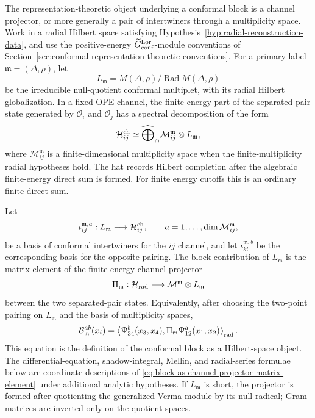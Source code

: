 The representation-theoretic object underlying a conformal block is a channel
projector, or more generally a pair of intertwiners through a multiplicity
space.  Work in a radial Hilbert space satisfying
Hypothesis~\ref{hyp:radial-reconstruction-data}, and use the positive-energy
\(\widetilde G_{\rm conf}^{\rm Lor}\)-module conventions of
Section~\ref{sec:conformal-representation-theoretic-conventions}.  For a
primary label \(\mathfrak m=(\Delta,\rho)\), let
\[
  L_{\mathfrak m}
  =
  M(\Delta,\rho)/\operatorname{Rad}M(\Delta,\rho)
\]
be the irreducible null-quotient conformal multiplet, with its radial Hilbert
globalization.  In a fixed OPE channel, the finite-energy part of the
separated-pair state generated by \(\mathcal O_i\) and \(\mathcal O_j\) has a
spectral decomposition of the form
\begin{equation}
  \mathcal H_{ij}^{\rm ch}
  \simeq
  \widehat\bigoplus_{\mathfrak m}
  \mathcal M_{ij}^{\mathfrak m}\otimes L_{\mathfrak m},
  \label{eq:channel-hilbert-module-decomposition}
\end{equation}
where \(\mathcal M_{ij}^{\mathfrak m}\) is a finite-dimensional multiplicity
space when the finite-multiplicity radial hypotheses hold.  The hat records
Hilbert completion after the algebraic finite-energy direct sum is formed.
For finite energy cutoffs this is an ordinary finite direct sum.

Let
\[
  \iota_{ij}^{\mathfrak m,a}:L_{\mathfrak m}\longrightarrow
  \mathcal H_{ij}^{\rm ch},
  \qquad
  a=1,\ldots,\dim\mathcal M_{ij}^{\mathfrak m},
\]
be a basis of conformal intertwiners for the \(ij\) channel, and let
\(\iota_{kl}^{\mathfrak m,b}\) be the corresponding basis for the opposite
pairing.  The block contribution of \(L_{\mathfrak m}\) is the matrix element
of the finite-energy channel projector
\[
  \Pi_{\mathfrak m}
  :
  \mathcal H_{\rm rad}\longrightarrow
  \mathcal M^{\mathfrak m}\otimes L_{\mathfrak m}
\]
between the two separated-pair states.  Equivalently, after choosing the
two-point pairing on \(L_{\mathfrak m}\) and the basis of multiplicity spaces,
\begin{equation}
  \mathcal B_{\mathfrak m}^{ab}(x_i)
  =
  \left\langle
    \Psi_{34}^{b}(x_3,x_4),
    \Pi_{\mathfrak m}
    \Psi_{12}^{a}(x_1,x_2)
  \right\rangle_{\rm rad}.
  \label{eq:block-as-channel-projector-matrix-element}
\end{equation}
This equation is the definition of the conformal block as a Hilbert-space
object.  The differential-equation, shadow-integral, Mellin, and radial-series
formulae below are coordinate descriptions of
\eqref{eq:block-as-channel-projector-matrix-element} under additional
analytic hypotheses.  If \(L_{\mathfrak m}\) is short, the projector is formed
after quotienting the generalized Verma module by its null radical; Gram
matrices are inverted only on the quotient spaces.

